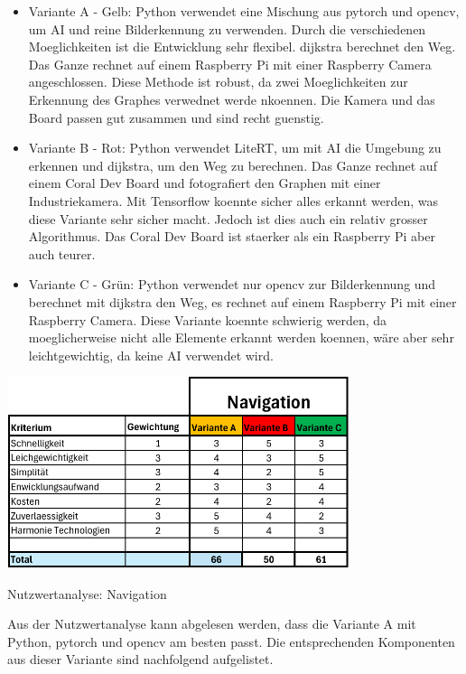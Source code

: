 \begin{itemize}
     \item Variante A - Gelb: Python verwendet eine Mischung aus \gls{pytorch} und \gls{opencv}, um AI und reine Bilderkennung zu verwenden. Durch die verschiedenen Moeglichkeiten ist die Entwicklung sehr flexibel. \gls{dijkstra} berechnet den Weg. Das Ganze rechnet auf einem Raspberry Pi mit einer Raspberry Camera angeschlossen. Diese Methode ist robust, da zwei Moeglichkeiten zur Erkennung des Graphes verwednet werde nkoennen. Die Kamera und das Board passen gut zusammen und sind recht guenstig. 
    \item  Variante B - Rot: Python verwendet LiteRT, um mit AI die Umgebung zu erkennen und \gls{dijkstra}, um den Weg zu berechnen. Das Ganze rechnet auf einem Coral Dev Board und fotografiert den Graphen mit einer Industriekamera. Mit Tensorflow koennte sicher alles erkannt werden, was diese Variante sehr sicher macht. Jedoch ist dies auch ein relativ grosser Algorithmus. Das Coral Dev Board ist staerker als ein Raspberry Pi aber auch teurer.
    \item Variante C - Grün: Python verwendet nur \gls{opencv} zur Bilderkennung und berechnet mit \gls{dijkstra} den Weg, es rechnet auf einem Raspberry Pi mit einer Raspberry Camera. Diese Variante koennte schwierig werden, da moeglicherweise nicht alle Elemente erkannt werden koennen, wäre aber sehr leichtgewichtig, da keine AI verwendet wird.
\end{itemize}


\begin{table}[H]
\centering
\includegraphics[width=0.75\textwidth]{assets/Nutzwertanalyse-I.pdf}
\caption{Nutzwertanalyse: Navigation}
\label{table:nutzwert-informatik}
\end{table}

Aus der Nutzwertanalyse kann abgelesen werden, dass die Variante A mit Python, \gls{pytorch} und \gls{opencv} am besten passt. Die entsprechenden Komponenten aus dieser Variante sind nachfolgend aufgelistet.

